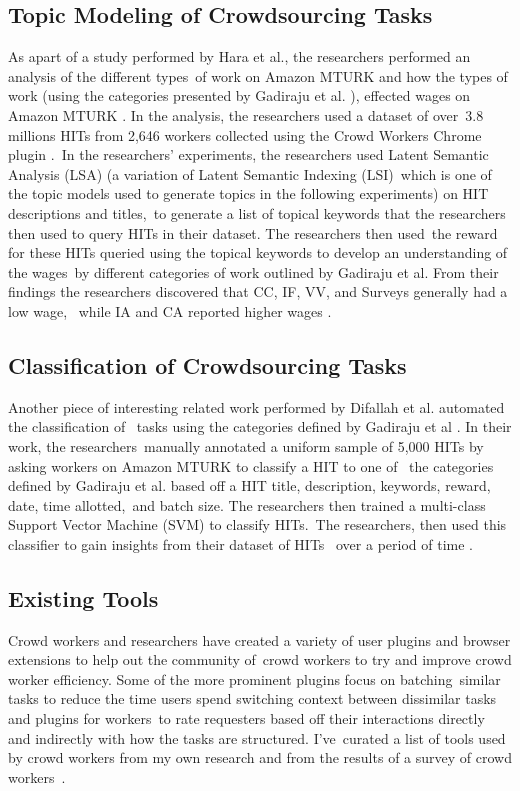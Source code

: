 \documentclass[letterpaper,12pt]{article}
\begin{document}
\subsection{Topic Modeling of Crowdsourcing Tasks}
As apart of a study performed by Hara et al., the researchers performed an analysis of the different types\
of work on Amazon MTURK and how the types of work (using the categories presented by Gadiraju et al. \cite{gadiraju2014taxonomy}),
effected wages on Amazon MTURK \cite{hara2018data}. In the analysis, the researchers used a dataset of over\
3.8 millions HITs from 2,646 workers collected using the Crowd Workers Chrome plugin \cite{hara2018data,callison2014crowd}.\
In the researchers' experiments, the researchers used Latent Semantic Analysis (LSA) (a variation of Latent Semantic Indexing (LSI)\
which is one of the topic models used to generate topics in the following experiments) on HIT descriptions and titles,\
to generate a list of topical keywords that the researchers then used to query HITs in their dataset. The researchers then used\
the reward for these HITs queried using the topical keywords to develop an understanding of the wages\
by different categories of work outlined by Gadiraju et al.
From their findings the researchers discovered that CC, IF, VV, and Surveys generally had a low wage, \
while IA and CA reported higher wages \cite{hara2018data}. 

\subsection{Classification of Crowdsourcing Tasks}
Another piece of interesting related work performed by Difallah et al. automated the classification of \
tasks using the categories defined by Gadiraju et al \cite{difallah2015dynamics}. In their work, the researchers\
manually annotated a uniform sample of 5,000 HITs by asking workers on Amazon MTURK to classify a HIT to one of \
the categories defined by Gadiraju et al. based off a HIT title, description, keywords, reward, date, time allotted,\
and batch size. The researchers then trained a multi-class Support Vector Machine (SVM) to classify HITs.\
The researchers, then used this classifier to gain insights from their dataset of HITs \
over a period of time \cite{difallah2015dynamics}. 

\subsection{Existing Tools}
Crowd workers and researchers have created a variety of user plugins and browser extensions to help out the community of\
crowd workers to try and improve crowd worker efficiency. Some of the more prominent plugins focus on batching\
similar tasks to reduce the time users spend switching context between dissimilar tasks and plugins for workers\
to rate requesters based off their interactions directly and indirectly with how the tasks are structured. I've\
curated a list of tools used by crowd workers from my own research and from the results of a survey of crowd workers\
\cite{Kaplan2018}. 
\end{document}
